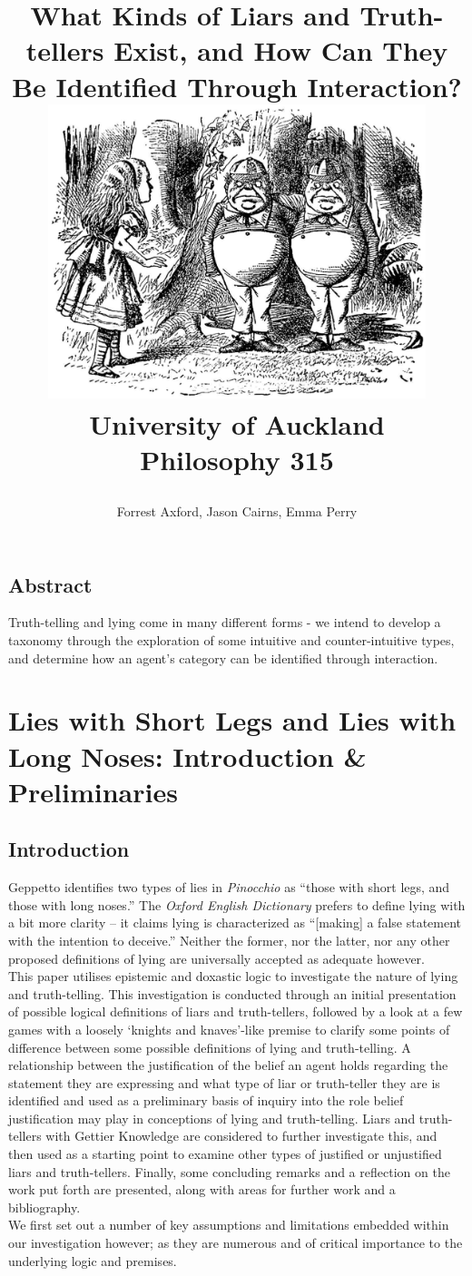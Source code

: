 \documentclass[12pt, titlepage, twoside, a4paper]{report}
\title{
{What Kinds of Liars and Truth-tellers Exist, and How Can They Be Identified Through Interaction?} \newline \newline
{\includegraphics[width=11cm]{alice.eps}}\\
{\large University of Auckland}\\
{\large Philosophy 315}\\
\author{Forrest Axford, Jason Cairns, Emma Perry}}
\begin{document}
\maketitle
\tableofcontents
\newpage
\section*{Abstract}
Truth-telling and lying come in many different forms - we intend to develop a taxonomy through the exploration of some intuitive and counter-intuitive types, and determine how an agent's category can be identified through interaction.

\chapter{Lies with Short Legs and Lies with Long Noses: Introduction \& Preliminaries}

\section{Introduction}
Geppetto identifies two types of lies in \textit{Pinocchio} as ``those with short legs, and those with long noses.'' The \textit{Oxford English Dictionary} prefers to define lying with a bit more clarity – it claims lying is characterized as “[making] a false statement with the intention to deceive.” \autocite{WeinerE.S.C.1989TOEd} Neither the former, nor the latter, nor any other proposed definitions of lying are universally accepted as adequate however.\autocite{sep-lying-definition}\\
This paper utilises epistemic and doxastic logic to investigate the nature of lying and truth-telling. This investigation is conducted through an initial presentation of possible logical definitions of liars and truth-tellers, followed by a look at a few games with a loosely `knights and knaves’-like premise to clarify some points of difference between some possible definitions of lying and truth-telling. A relationship between the justification of the belief an agent holds regarding the statement they are expressing and what type of liar or truth-teller they are is identified and used as a preliminary basis of inquiry into the role belief justification may play in conceptions of lying and truth-telling. Liars and truth-tellers with Gettier Knowledge are considered to further investigate this, and then used as a starting point to examine other types of justified or unjustified liars and truth-tellers. Finally, some concluding remarks and a reflection on the work put forth are presented, along with areas for further work and a bibliography.\\
We first set out a number of key assumptions and limitations embedded within our investigation however; as they are numerous and of critical importance to the underlying logic and premises.
\end{document}
